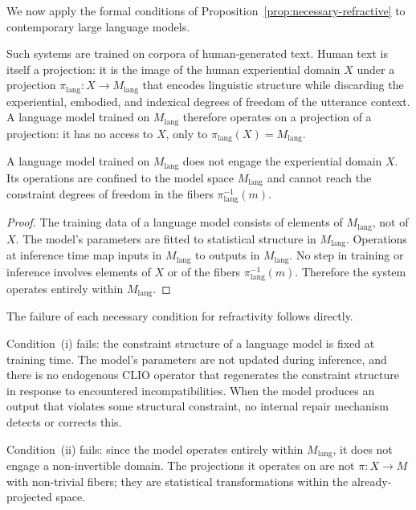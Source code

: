 \documentclass[11pt,openany]{book}
\begin{document}
We now apply the formal conditions of
Proposition~\ref{prop:necessary-refractive} to contemporary
large language models.

Such systems are trained on corpora of human-generated
text.  Human text is itself a projection: it is the image
of the human experiential domain $X$ under a projection
$\pi_{\mathrm{lang}} : X \to M_{\mathrm{lang}}$ that
encodes linguistic structure while discarding the
experiential, embodied, and indexical degrees of freedom
of the utterance context.  A language model trained on
$M_{\mathrm{lang}}$ therefore operates on a projection of
a projection: it has no access to $X$, only to
$\pi_{\mathrm{lang}}(X) = M_{\mathrm{lang}}$.

\begin{proposition}
\label{prop:llm-projected}
A language model trained on $M_{\mathrm{lang}}$ does not
engage the experiential domain $X$.  Its operations are
confined to the model space $M_{\mathrm{lang}}$ and cannot
reach the constraint degrees of freedom in the fibers
$\pi_{\mathrm{lang}}^{-1}(m)$.
\end{proposition}

\begin{proof}
The training data of a language model consists of elements
of $M_{\mathrm{lang}}$, not of $X$.  The model's parameters
are fitted to statistical structure in $M_{\mathrm{lang}}$.
Operations at inference time map inputs in $M_{\mathrm{lang}}$
to outputs in $M_{\mathrm{lang}}$.  No step in training or
inference involves elements of $X$ or of the fibers
$\pi_{\mathrm{lang}}^{-1}(m)$.  Therefore the system
operates entirely within $M_{\mathrm{lang}}$.
\end{proof}

The failure of each necessary condition for refractivity
follows directly.

Condition~(i) fails: the constraint structure of a language
model is fixed at training time.  The model's parameters
are not updated during inference, and there is no
endogenous CLIO operator that regenerates the constraint
structure in response to encountered incompatibilities.
When the model produces an output that violates some
structural constraint, no internal repair mechanism detects
or corrects this.

Condition~(ii) fails: since the model operates entirely
within $M_{\mathrm{lang}}$, it does not engage a
non-invertible domain.  The projections it operates on are
not $\pi : X \to M$ with non-trivial fibers; they are
statistical transformations within the already-projected
space.
\end{document}

